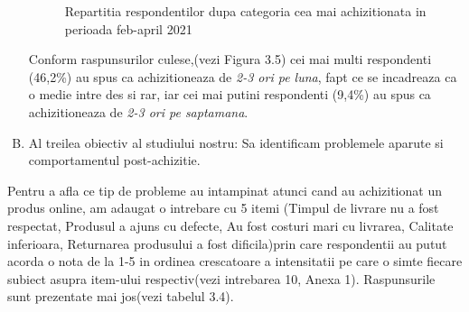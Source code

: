 \documentclass[a4paper, 12pt]{article}
\begin{document}
\begin{enumerate}[(A)]
\begin{figure}[!htb]
			\caption{Repartitia respondentilor dupa categoria cea mai achizitionata in perioada feb-april 2021} 
		\end{figure}
\newpage
		\qquad Conform raspunsurilor culese,(vezi Figura 3.5) cei mai multi respondenti (46,2\%) au spus ca achizitioneaza de \textit{2-3 ori pe luna}, fapt ce se incadreaza ca o medie intre des si rar, iar cei mai putini respondenti (9,4\%) au spus ca achizitioneaza de \textit{2-3 ori pe saptamana}.
	
		\item Al treilea obiectiv al studiului nostru: Sa identificam problemele aparute si comportamentul post-achizitie.
\end{enumerate}		

		\quad Pentru a afla ce tip de probleme au intampinat atunci cand au achizitionat un produs online, am adaugat o intrebare cu 5 itemi (Timpul de livrare nu a fost respectat, Produsul a ajuns cu defecte, Au fost costuri mari cu livrarea, Calitate inferioara, Returnarea produsului a fost dificila)prin care respondentii au putut acorda o nota de la 1-5 in ordinea crescatoare a intensitatii pe care o simte fiecare subiect asupra item-ului respectiv(vezi intrebarea 10, Anexa 1). Raspunsurile sunt prezentate mai jos(vezi tabelul 3.4).
	\newline
		
\end{document}
